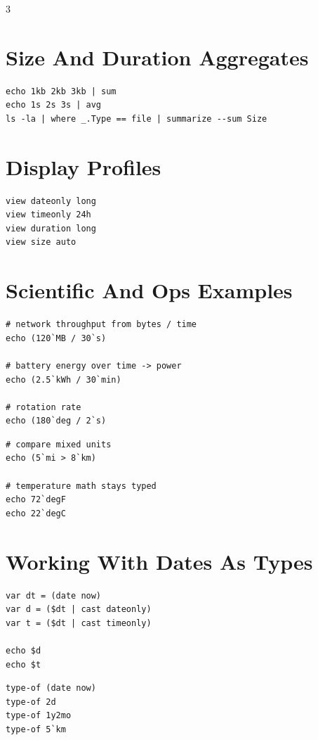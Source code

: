 \begin{multicols*}{3}
\section{Size And Duration Aggregates}
\begin{lstlisting}
echo 1kb 2kb 3kb | sum
echo 1s 2s 3s | avg
ls -la | where _.Type == file | summarize --sum Size
\end{lstlisting}


\section{Display Profiles}
\begin{lstlisting}
view dateonly long
view timeonly 24h
view duration long
view size auto
\end{lstlisting}

\columnbreak

\section{Scientific And Ops Examples}
\begin{lstlisting}
# network throughput from bytes / time
echo (120`MB / 30`s)

# battery energy over time -> power
echo (2.5`kWh / 30`min)

# rotation rate
echo (180`deg / 2`s)
\end{lstlisting}

\begin{lstlisting}
# compare mixed units
echo (5`mi > 8`km)

# temperature math stays typed
echo 72`degF
echo 22`degC
\end{lstlisting}

\section{Working With Dates As Types}
\begin{lstlisting}
var dt = (date now)
var d = ($dt | cast dateonly)
var t = ($dt | cast timeonly)

echo $d
echo $t
\end{lstlisting}

\begin{lstlisting}
type-of (date now)
type-of 2d
type-of 1y2mo
type-of 5`km
\end{lstlisting}


\end{multicols*}
